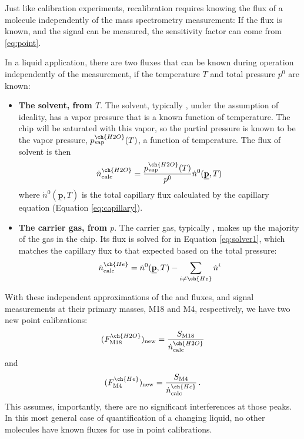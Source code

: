 \documentclass{article}
\renewcommand{\vec}[1]{\underline{\mathbf{#1}}}
\begin{document}
Just like calibration experiments, recalibration requires knowing the flux of a molecule independently of the mass spectrometry measurement: If the flux is known, and the signal can be measured, the sensitivity factor can come from \ref{eq:point}.

In a liquid application, there are two fluxes that can be known during operation independently of the measurement, if the temperature $T$ and total pressure $p^0$ are known:
\begin{itemize}
	\item \textbf{The solvent, from $T$}. The solvent, typically , under the assumption of ideality, has a vapor pressure that is a known function of temperature. The chip will be saturated with this vapor, so the partial pressure is known to be the vapor pressure, $p^{\ch{H2O}}_\text{vap}(T)$, a function of temperature. The flux of solvent is then
	\begin{equation}
		\dot{n}^{\ch{H2O}}_\text{calc} = \frac{p^{\ch{H2O}}_\text{vap}(T)}{p^0} \dot{n}^0(\vec{p}, T)\, \label{eq:solvent}
	\end{equation}
	where $\dot{n}^0(\vec{p}, T)$ is the total capillary flux calculated by the capillary equation (Equation \ref{eq:capillary}). 
	
	\item \textbf{The carrier gas, from $p$}. The carrier gas, typically , makes up the majority of the gas in the chip. Its flux is solved for in Equation \ref{eq:solver1}, which matches the capillary flux to that expected based on the total pressure:
	\begin{equation}
	\dot{n}^{\ch{He}}_\text{calc} = \dot{n}^0(\vec{p}, T) -  \sum_{i\ne \ch{He}}\dot{n}^i \label{eq:carrier}
	\end{equation}
\end{itemize}

With these independent approximations of the  and  fluxes, and signal measurements at their primary masses, M18 and M4, respectively, we have two new point calibrations:
\begin{equation}
	(F^{\ch{H2O}}_\text{M18})_\text{new} = \frac{S_\text{M18}}{\dot{n}^{\ch{H2O}}_\text{calc}}\label{eq:H2ORecal}
\end{equation}
and
\begin{equation}
	(F^{\ch{He}}_\text{M4})_\text{new} = \frac{S_\text{M4}}{\dot{n}^{\ch{He}}_\text{calc}}\,.\label{eq:HeRecal}
\end{equation}
This assumes, importantly, there are no significant interferences at those peaks. In this most general case of quantification of a changing liquid, no other molecules have known fluxes for use in point calibrations.
\end{document}
